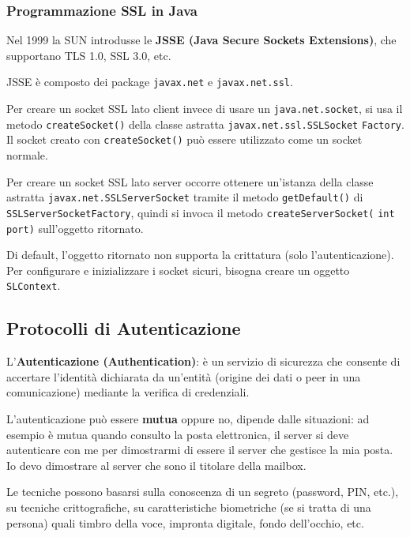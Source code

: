             

        \subsubsection{Programmazione SSL in Java}
            Nel 1999 la SUN introdusse le \textbf{JSSE (Java Secure Sockets Extensions)}, che supportano TLS 1.0, SSL 3.0, etc.
            
            JSSE è composto dei package \verb|javax.net| e \verb|javax.net.ssl|.
        
            Per creare un socket SSL lato client invece di usare un \verb|java.net.socket|, si usa il metodo \verb|createSocket()| della classe astratta \verb|javax.net.ssl.SSLSocket| \verb|Factory|. Il socket creato con \verb|createSocket()| può essere utilizzato come un socket normale.
        
            Per creare un socket SSL lato server occorre ottenere un'istanza della classe astratta \verb|javax.net.SSLServerSocket| tramite il metodo \verb|getDefault()| di \verb|SSLServerSocketFactory|, quindi si invoca il metodo \verb|createServerSocket(| \verb|int port)| sull'oggetto ritornato.
        
            Di default, l'oggetto ritornato non supporta la crittatura (solo l'autenticazione). Per configurare e inizializzare i socket sicuri, bisogna creare un oggetto \verb|SLContext|.

    \subsection{Protocolli di Autenticazione}
        L'\textbf{Autenticazione (Authentication)}: è un servizio di sicurezza che consente di accertare l'identità dichiarata da un'entità (origine dei dati o peer in una comunicazione) mediante la verifica di credenziali.
    
        L'autenticazione può essere \textbf{mutua} oppure no, dipende dalle situazioni: ad esempio è mutua quando consulto la posta elettronica, il server si deve autenticare con me per dimostrarmi di essere il server che gestisce la mia posta. Io devo dimostrare al server che sono il titolare della mailbox.

        Le tecniche possono basarsi sulla conoscenza di un segreto (password, PIN, etc.), su tecniche crittografiche, su caratteristiche biometriche (se si tratta di una persona) quali timbro della voce, impronta digitale, fondo dell'occhio, etc.

